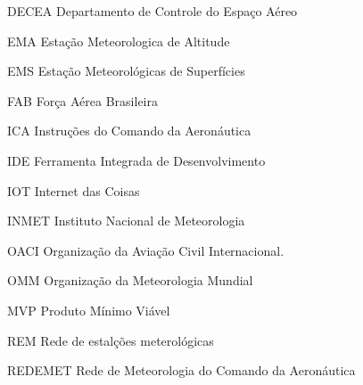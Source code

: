 \begin{siglas}
  \item[DECEA] Departamento de Controle do Espaço Aéreo
  \item[EMA] Estação Meteorologica de Altitude
  \item[EMS] Estação Meteorológicas de Superfícies
  \item[FAB] Força Aérea Brasileira
  \item[ICA] Instruções do Comando da Aeronáutica
  \item[IDE] Ferramenta Integrada de Desenvolvimento
  \item[IOT] Internet das Coisas
  \item[INMET] Instituto Nacional de Meteorologia
  \item[OACI] Organização da Aviação Civil Internacional.
  \item[OMM] Organização da Meteorologia Mundial
  \item[MVP] Produto Mínimo Viável
  \item[REM] Rede de estalções meterológicas
  \item[REDEMET] Rede de Meteorologia do Comando da Aeronáutica

\end{siglas}